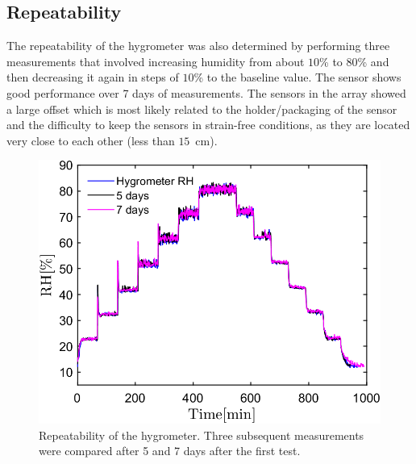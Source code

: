 \subsection{Repeatability}
The repeatability of the hygrometer was also determined by performing three measurements that involved increasing humidity from about $10$\% to $80$\% and then decreasing it again in steps of $10$\% to the baseline value. The sensor shows good performance over 7 days of measurements. The sensors in the array showed a large offset which is most likely related to the holder/packaging of the sensor and the difficulty to keep the sensors in strain-free conditions, as they are located very close to each other (less than $15$~cm).
\begin{figure}[!h]
\centering
\includegraphics[width=0.6\columnwidth]{Chapter5/images/repeat.png}
\caption{Repeatability of the hygrometer. Three subsequent measurements were compared after 5 and 7 days after the first test.}
\label{fig_repeatability}
\end{figure}



